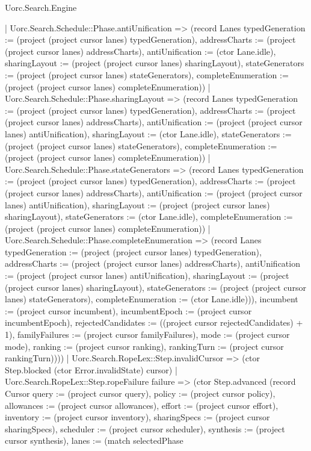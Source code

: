 \begin{lexlean}{Uorc.Search.Engine}
\begin{semanticmodule}
{{          | Uorc.Search.Schedule::Phase.antiUnification => (record Lanes {typedGeneration := (project (project cursor lanes) typedGeneration), addressCharts := (project (project cursor lanes) addressCharts), antiUnification := (ctor Lane.idle), sharingLayout := (project (project cursor lanes) sharingLayout), stateGenerators := (project (project cursor lanes) stateGenerators), completeEnumeration := (project (project cursor lanes) completeEnumeration)})
          | Uorc.Search.Schedule::Phase.sharingLayout => (record Lanes {typedGeneration := (project (project cursor lanes) typedGeneration), addressCharts := (project (project cursor lanes) addressCharts), antiUnification := (project (project cursor lanes) antiUnification), sharingLayout := (ctor Lane.idle), stateGenerators := (project (project cursor lanes) stateGenerators), completeEnumeration := (project (project cursor lanes) completeEnumeration)})
          | Uorc.Search.Schedule::Phase.stateGenerators => (record Lanes {typedGeneration := (project (project cursor lanes) typedGeneration), addressCharts := (project (project cursor lanes) addressCharts), antiUnification := (project (project cursor lanes) antiUnification), sharingLayout := (project (project cursor lanes) sharingLayout), stateGenerators := (ctor Lane.idle), completeEnumeration := (project (project cursor lanes) completeEnumeration)})
          | Uorc.Search.Schedule::Phase.completeEnumeration => (record Lanes {typedGeneration := (project (project cursor lanes) typedGeneration), addressCharts := (project (project cursor lanes) addressCharts), antiUnification := (project (project cursor lanes) antiUnification), sharingLayout := (project (project cursor lanes) sharingLayout), stateGenerators := (project (project cursor lanes) stateGenerators), completeEnumeration := (ctor Lane.idle)})), incumbent := (project cursor incumbent), incumbentEpoch := (project cursor incumbentEpoch), rejectedCandidates := ((project cursor rejectedCandidates) + 1), familyFailures := (project cursor familyFailures), mode := (project cursor mode), ranking := (project cursor ranking), rankingTurn := (project cursor rankingTurn)})))
      | Uorc.Search.RopeLex::Step.invalidCursor => (ctor Step.blocked (ctor Error.invalidState) cursor)
      | Uorc.Search.RopeLex::Step.ropeFailure failure => (ctor Step.advanced (record Cursor {query := (project cursor query), policy := (project cursor policy), allowances := (project cursor allowances), effort := (project cursor effort), inventory := (project cursor inventory), sharingSpecs := (project cursor sharingSpecs), scheduler := (project cursor scheduler), synthesis := (project cursor synthesis), lanes := (match selectedPhase
}}
\end{semanticmodule}
\end{lexlean}
